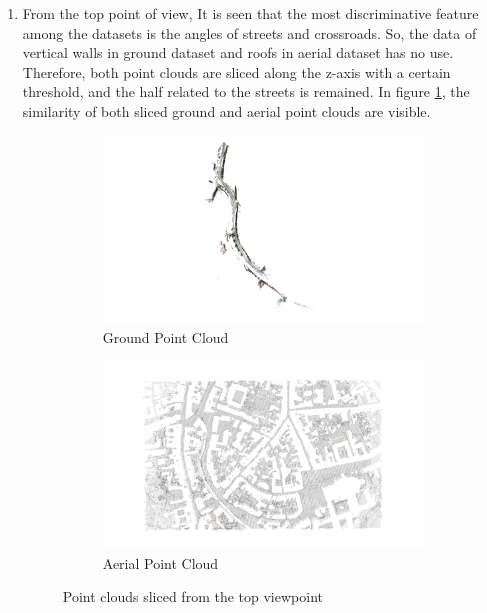 \documentclass[11pt]{article}
\begin{document}
\begin{enumerate}
        \item From the top point of view, It is seen that the most discriminative feature among the datasets
        is the angles of streets and crossroads. So, the data of vertical walls in ground dataset and roofs
        in aerial dataset has no use. Therefore, both point clouds are sliced along the z-axis with a certain
        threshold, and the half related to the streets is remained. In figure \ref{fig:ply_sliced}, the similarity of
        both sliced ground and aerial point clouds are visible.
        \begin{figure}
            \centering
            \begin{subfigure}{0.45\textwidth}
                \centering
                \includegraphics[width=\linewidth]{images/experiment/ply_sliced_ground}
                \caption{Ground Point Cloud}
            \end{subfigure}
            \hfill
            \begin{subfigure}{0.45\textwidth}
                \centering
                \includegraphics[width=\linewidth]{images/experiment/ply_sliced_aerial}
                \caption{Aerial Point Cloud}
            \end{subfigure}
            \caption{Point clouds sliced from the top viewpoint}
            \label{fig:ply_sliced}
        \end{figure}


\end{enumerate}
\end{document}
